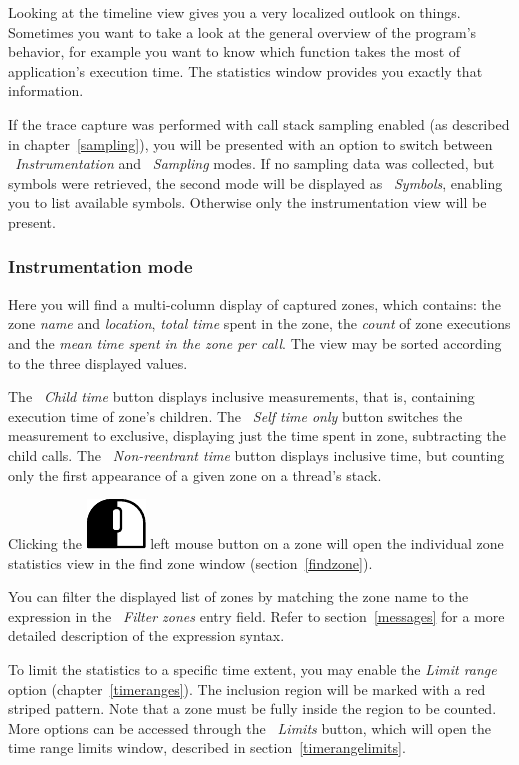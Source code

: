 \documentclass[hidelinks,titlepage,a4paper]{article}
\newcommand{\LMB}{\includegraphics[height=.8\baselineskip]{icons/lmb}}
\begin{document}
Looking at the timeline view gives you a very localized outlook on things. Sometimes you want to take a look at the general overview of the program's behavior, for example you want to know which function takes the most of application's execution time. The statistics window provides you exactly that information.

If the trace capture was performed with call stack sampling enabled (as described in chapter~\ref{sampling}), you will be presented with an option to switch between \emph{\faSyringe{}~Instrumentation} and \emph{\faEyeDropper{}~Sampling} modes. If no sampling data was collected, but symbols were retrieved, the second mode will be displayed as \emph{\faPuzzlePiece{}~Symbols}, enabling you to list available symbols. Otherwise only the instrumentation view will be present.

\subsubsection{Instrumentation mode}

Here you will find a multi-column display of captured zones, which contains: the zone \emph{name} and \emph{location}, \emph{total time} spent in the zone, the \emph{count} of zone executions and the \emph{mean time spent in the zone per call}. The view may be sorted according to the three displayed values.

The \emph{\faClock{}~Child time} button displays inclusive measurements, that is, containing execution time of zone's children. The \emph{\faClock{}~Self time only} button switches the measurement to exclusive, displaying just the time spent in zone, subtracting the child calls. The \emph{\faClock{}~Non-reentrant time} button displays inclusive time, but counting only the first appearance of a given zone on a thread's stack.

Clicking the \LMB{} left mouse button on a zone will open the individual zone statistics view in the find zone window (section~\ref{findzone}).

You can filter the displayed list of zones by matching the zone name to the expression in the \emph{\faFilter{}~Filter zones} entry field. Refer to section~\ref{messages} for a more detailed description of the expression syntax.

To limit the statistics to a specific time extent, you may enable the \emph{Limit range} option (chapter~\ref{timeranges}). The inclusion region will be marked with a red striped pattern. Note that a zone must be fully inside the region to be counted. More options can be accessed through the \emph{\faRuler{}~Limits} button, which will open the time range limits window, described in section~\ref{timerangelimits}.
\end{document}
